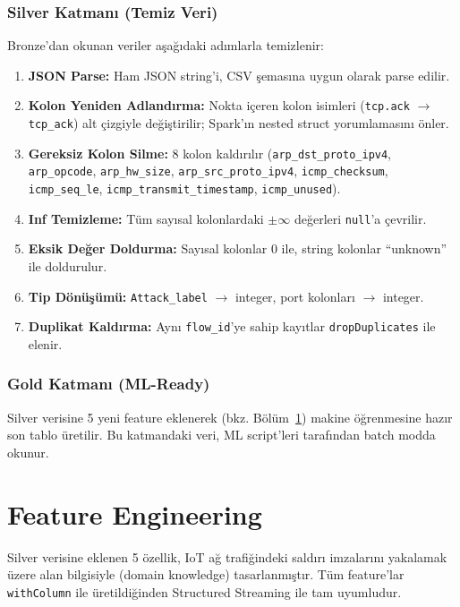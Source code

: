 \documentclass[12pt,a4paper]{article}
\begin{document}
\subsubsection{Silver Katmanı (Temiz Veri)}
Bronze'dan okunan veriler aşağıdaki adımlarla temizlenir:
\begin{enumerate}[noitemsep]
  \item \textbf{JSON Parse:} Ham JSON string'i, CSV şemasına uygun olarak parse edilir.
  \item \textbf{Kolon Yeniden Adlandırma:} Nokta içeren kolon isimleri (\texttt{tcp.ack} $\to$ \texttt{tcp\_ack}) alt çizgiyle değiştirilir; Spark'ın nested struct yorumlamasını önler.
  \item \textbf{Gereksiz Kolon Silme:} 8 kolon kaldırılır (\texttt{arp\_dst\_proto\_ipv4}, \texttt{arp\_opcode}, \texttt{arp\_hw\_size}, \texttt{arp\_src\_proto\_ipv4}, \texttt{icmp\_checksum}, \texttt{icmp\_seq\_le}, \texttt{icmp\_transmit\_timestamp}, \texttt{icmp\_unused}).
  \item \textbf{Inf Temizleme:} Tüm sayısal kolonlardaki $\pm\infty$ değerleri \texttt{null}'a çevrilir.
  \item \textbf{Eksik Değer Doldurma:} Sayısal kolonlar 0 ile, string kolonlar ``unknown'' ile doldurulur.
  \item \textbf{Tip Dönüşümü:} \texttt{Attack\_label} $\to$ integer, port kolonları $\to$ integer.
  \item \textbf{Duplikat Kaldırma:} Aynı \texttt{flow\_id}'ye sahip kayıtlar \texttt{dropDuplicates} ile elenir.
\end{enumerate}

\subsubsection{Gold Katmanı (ML-Ready)}
Silver verisine 5 yeni feature eklenerek (bkz. Bölüm~\ref{sec:fe}) makine öğrenmesine hazır son tablo üretilir. Bu katmandaki veri, ML script'leri tarafından batch modda okunur.

\section{Feature Engineering}
\label{sec:fe}

Silver verisine eklenen 5 özellik, IoT ağ trafiğindeki saldırı imzalarını yakalamak üzere alan bilgisiyle (domain knowledge) tasarlanmıştır. Tüm feature'lar \texttt{withColumn} ile üretildiğinden Structured Streaming ile tam uyumludur.
\end{document}

